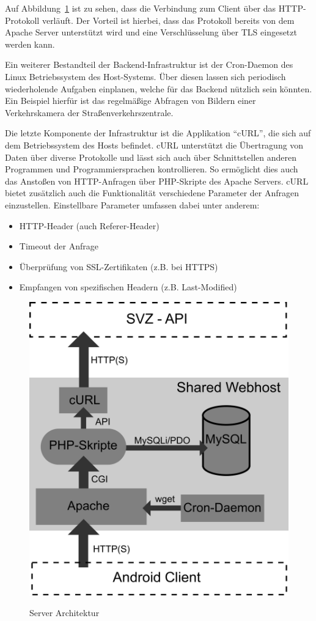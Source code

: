 Auf Abbildung~\ref{fig:serverarch} ist zu sehen, dass die Verbindung zum Client über das HTTP-Protokoll verläuft. 
Der Vorteil ist hierbei, dass das Protokoll bereits von dem Apache Server unterstützt wird und eine Verschlüsselung über TLS eingesetzt werden kann.

Ein weiterer Bestandteil der Backend-Infrastruktur ist der Cron-Daemon des Linux Betriebssystem des Host-Systems.
Über diesen lassen sich periodisch wiederholende Aufgaben einplanen, welche für das Backend nützlich sein könnten.
Ein Beispiel hierfür ist das regelmäßige Abfragen von Bildern einer Verkehrskamera der Straßenverkehrszentrale.

Die letzte Komponente der Infrastruktur ist die Applikation "`cURL"', die sich auf dem Betriebssystem des Hosts befindet.
cURL unterstützt die Übertragung von Daten über diverse Protokolle und lässt sich auch über Schnittstellen anderen Programmen und Programmiersprachen kontrollieren.
So ermöglicht dies auch das Anstoßen von HTTP-Anfragen über PHP-Skripte des Apache Servers.
cURL bietet zusätzlich auch die Funktionalität verschiedene Parameter der Anfragen einzustellen.
Einstellbare Parameter umfassen dabei unter anderem:
\begin{itemize}
\item{HTTP-Header (auch Referer-Header)}
\item{Timeout der Anfrage}
\item{Überprüfung von SSL-Zertifikaten (z.B. bei HTTPS)}
\item{Empfangen von spezifischen Headern (z.B. Last-Modified)}
\end{itemize}
\begin{figure}[hp]
   \centering
     \includegraphics[width=13cm]{Bilder/server-arch} \\
 \caption{Server Architektur}
 \label{fig:serverarch}
\end{figure}
\newpage
